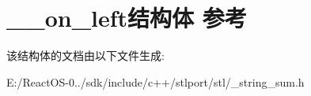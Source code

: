\hypertarget{struct____on__left}{}\section{\+\_\+\+\_\+on\+\_\+left结构体 参考}
\label{struct____on__left}


该结构体的文档由以下文件生成\+:\begin{DoxyCompactItemize}
\item 
E\+:/\+React\+O\+S-\/0../sdk/include/c++/stlport/stl/\+\_\+string\+\_\+sum.\+h\end{DoxyCompactItemize}
